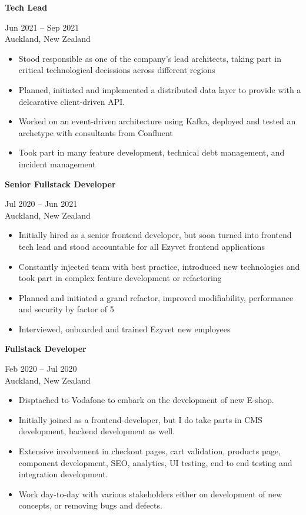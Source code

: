 \documentclass[10pt,a4paper,ragged2e,withhyper]{altacv}
\renewcommand{\cvevent}[4]{%
  \textbf{#1} %
  \hfill %
  \begin{minipage}[t]{.5\linewidth}
    \raggedleft %
    \small#3 %
    \\ %
    #4 %
  \end{minipage}
  \vspace{\baselineskip} %
}
\begin{document}
\divider

\vspace{0.5cm}

\cvevent{Tech Lead}{Idexx Laboratories}{Jun 2021 -- Sep 2021}{Auckland, New Zealand}
\begin{itemize}
\item Stood responsible as one of the company’s lead architects, taking part in critical technological decissions across different regions 
\item Planned, initiated and implemented a distributed data layer to provide with a delcarative client-driven API.
\item Worked on an event-driven architecture using Kafka, deployed and tested an archetype with consultants from Confluent 
\item Took part in many feature development, technical debt management, and incident management
\end{itemize}

\divider

\vspace{0.5cm}

\cvevent{Senior Fullstack Developer}{ezyVet}{Jul 2020 -- Jun 2021}{Auckland, New Zealand}
\divider

\begin{itemize}
  \item Initially hired as a senior frontend developer, but soon turned into frontend tech lead and stood accountable for all Ezyvet frontend applications
  \item Constantly injected team with best practice, introduced new technologies and took part in complex feature development or refactoring
  \item Planned and initiated a grand refactor, improved modifiability, performance and security by factor of 5 
  \item Interviewed, onboarded and trained Ezyvet new employees
  \end{itemize}

  \divider

  \vspace{0.5cm}

\cvevent{Fullstack Developer}{Infosys}{Feb 2020 -- Jul 2020}{Auckland, New Zealand}


\begin{itemize}
\item Disptached to Vodafone to embark on the development of new E-shop. 
\item Initially joined as a frontend-developer, but I do take parts in CMS development, backend development as well. 
\item Extensive involvement in checkout pages, cart validation, products page, component development, SEO, analytics, UI testing, end to end testing and integration development. 
\item Work day-to-day with various stakeholders either on development of new concepts, or removing bugs and defects.
\end{itemize}
\end{document}
